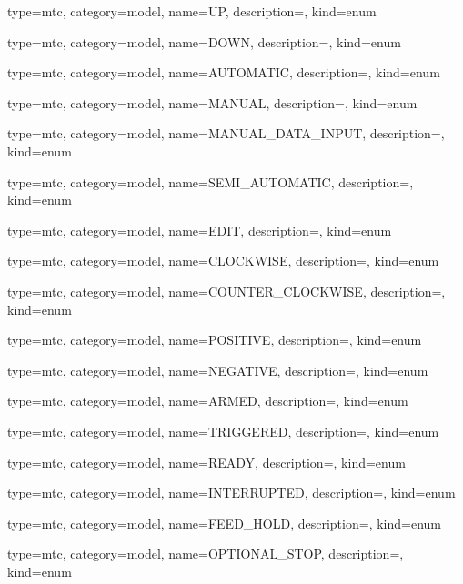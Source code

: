 {
  type=mtc,
  category=model,
  name={UP},
  description={},
  kind={enum}
}


{
  type=mtc,
  category=model,
  name={DOWN},
  description={},
  kind={enum}
}


{
  type=mtc,
  category=model,
  name={AUTOMATIC},
  description={},
  kind={enum}
}


{
  type=mtc,
  category=model,
  name={MANUAL},
  description={},
  kind={enum}
}


{
  type=mtc,
  category=model,
  name={MANUAL\_DATA\_INPUT},
  description={},
  kind={enum}
}


{
  type=mtc,
  category=model,
  name={SEMI\_AUTOMATIC},
  description={},
  kind={enum}
}


{
  type=mtc,
  category=model,
  name={EDIT},
  description={},
  kind={enum}
}


{
  type=mtc,
  category=model,
  name={CLOCKWISE},
  description={},
  kind={enum}
}


{
  type=mtc,
  category=model,
  name={COUNTER\_CLOCKWISE},
  description={},
  kind={enum}
}


{
  type=mtc,
  category=model,
  name={POSITIVE},
  description={},
  kind={enum}
}


{
  type=mtc,
  category=model,
  name={NEGATIVE},
  description={},
  kind={enum}
}


{
  type=mtc,
  category=model,
  name={ARMED},
  description={},
  kind={enum}
}


{
  type=mtc,
  category=model,
  name={TRIGGERED},
  description={},
  kind={enum}
}


{
  type=mtc,
  category=model,
  name={READY},
  description={},
  kind={enum}
}


{
  type=mtc,
  category=model,
  name={INTERRUPTED},
  description={},
  kind={enum}
}


{
  type=mtc,
  category=model,
  name={FEED\_HOLD},
  description={},
  kind={enum}
}


{
  type=mtc,
  category=model,
  name={OPTIONAL\_STOP},
  description={},
  kind={enum}
}


